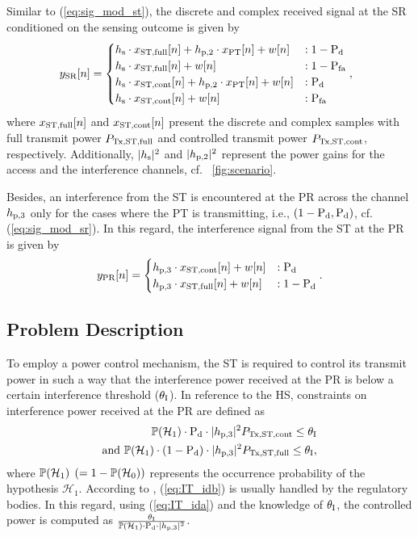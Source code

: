 Similar to (\ref{eq:sig_mod_st}), the discrete and complex received signal at the SR conditioned on the sensing outcome is given by 
\begin{equation}
\hspace{-2.3mm}
\ys[n] = 
\begin{cases}
\hs \cdot \xsfull[n] + \hptw \cdot \xp[n] + w[n] &: 1 - \pd \\
\hs \cdot \xsfull[n] + w[n] &: 1 - \pfa \\
\hs \cdot \xscont[n] + \hptw \cdot \xp[n] + w[n] &: \pd \\
\hs \cdot \xscont[n] + w[n] &: \pfa 
\end{cases},
\label{eq:sig_mod_sr}
\end{equation}
where $x_{\text{ST,full}}[n]$ and $x_{\text{ST,cont}}[n]$ present the discrete and complex samples with full transmit power $P_{\text{Tx,ST,full}}$ and controlled transmit power $P_{\text{Tx,ST,cont}}$, respectively. Additionally, $|h_{\text{s}}|^2$ and $|h_{\text{p,2}}|^2$ represent the power gains for the access and the interference channels, cf. \figurename~\ref{fig:scenario}. 


Besides, an interference from the ST is encountered at the PR across the channel $h_{\text{p,3}}$ only for the cases where the PT is transmitting, i.e., $(1 - \text{P}_{\text{d}}, \text{P}_{\text{d}})$, cf. (\ref{eq:sig_mod_sr}). In this regard, the interference signal from the ST at the PR is given by
\begin{equation}
\yp[n] = 
\begin{cases}
\hpth \cdot \xscont[n] + w[n] & : \pd \\
\hpth \cdot \xsfull[n] + w[n] & : 1- \pd 
\end{cases}.
\label{eq:sig_mod_pr}
\end{equation}

\subsection{Problem Description}
To employ a power control mechanism, the ST is required to control its transmit power in such a way that the interference power received at the PR is below a certain interference threshold ($\theta_{\text{I}}$). In reference to the HS, constraints on interference power received at the PR are defined as
\begin{align}
\pho \cdot \pd \cdot \phpth \preg \le \ite \label{eq:IT_ida} \\
\text{and   } \pho \cdot (1 - \pd) \cdot \phpth \pfull \le \ite \label{eq:IT_idb},
\end{align}
where $\mathbb P(\mathcal{H}_1)$ $(= 1 - \mathbb P(\mathcal{H}_0))$ represents the occurrence probability of the hypothesis $\mathcal H_1$. 
According to \cite{Sharma14}, (\ref{eq:IT_idb}) is usually handled by the regulatory bodies. In this regard, using (\ref{eq:IT_ida}) and the knowledge of $\theta_{\text{I}}$, the controlled power is computed as $\frac{\theta_{\text{I}}}{\mathbb P(\mathcal{H}_1) \cdot \text{P}_{\text{d}} \cdot |h_{\text{p,3}}|^2}$.

